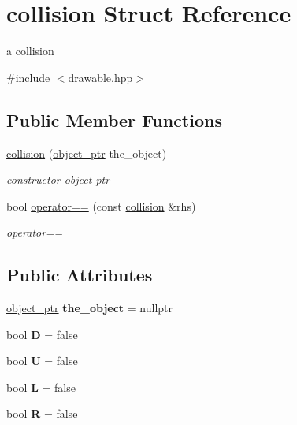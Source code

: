 \hypertarget{structcollision}{}\section{collision Struct Reference}
\label{structcollision}


a collision  




{\ttfamily \#include $<$drawable.\+hpp$>$}

\subsection*{Public Member Functions}
\begin{DoxyCompactItemize}
\item 
\hyperlink{structcollision_a8e4d3b4a9355c8946c0ad06ccc6e8d36}{collision} (\hyperlink{typedefs_8hpp_aab5add95f06d2ba25dbfed8eb07274fa}{object\+\_\+ptr} the\+\_\+object)
\begin{DoxyCompactList}\small\item\em constructor object ptr \end{DoxyCompactList}\item 
bool \hyperlink{structcollision_ab1721e643a7906b3e4319a86315fce1b}{operator==} (const \hyperlink{structcollision}{collision} \&rhs)
\begin{DoxyCompactList}\small\item\em operator== \end{DoxyCompactList}\end{DoxyCompactItemize}
\subsection*{Public Attributes}
\begin{DoxyCompactItemize}
\item 
\mbox{\label{structcollision_a7ed36890448403a8a50bf90565255e42}} 
\hyperlink{typedefs_8hpp_aab5add95f06d2ba25dbfed8eb07274fa}{object\+\_\+ptr} {\bfseries the\+\_\+object} = nullptr
\item 
\mbox{\label{structcollision_a650a2bb40b437483c892b299c21920e8}} 
bool {\bfseries D} = false
\item 
\mbox{\label{structcollision_a01f73e208a2d2c858a157ab895a58509}} 
bool {\bfseries U} = false
\item 
\mbox{\label{structcollision_ae07e40f8555ca518bf68ab3d85fcdb8e}} 
bool {\bfseries L} = false
\item 
\mbox{\label{structcollision_a89956863ae123b47eaf477b785a60a58}} 
bool {\bfseries R} = false
\end{DoxyCompactItemize}


